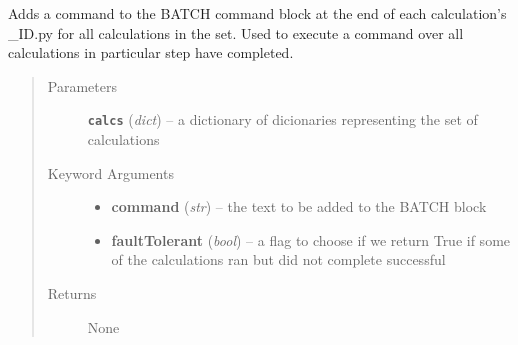\documentclass[letterpaper,10pt,english]{sphinxmanual}
\begin{document}

\begin{fulllineitems}
\label{prep:prep.runAfterAllDone}
Adds a command to the BATCH command block at the end of each calculation's \_ID.py
for all calculations in the set. Used to execute a command over all calculations
in particular step have completed.
\begin{quote}\begin{description}
\item[{Parameters}] \leavevmode
\textbf{\texttt{calcs}} (\emph{dict}) -- a dictionary of dicionaries representing the set of calculations

\item[{Keyword Arguments}] \leavevmode\begin{itemize}
\item {} 
\textbf{command} (\emph{str}) --
the text to be added to the BATCH block

\item {} 
\textbf{faultTolerant} (\emph{bool}) --
a flag to choose if we return True if some of the
calculations ran but did not complete successful

\end{itemize}

\item[{Returns}] \leavevmode
None

\end{description}\end{quote}

\end{fulllineitems}

\end{document}
